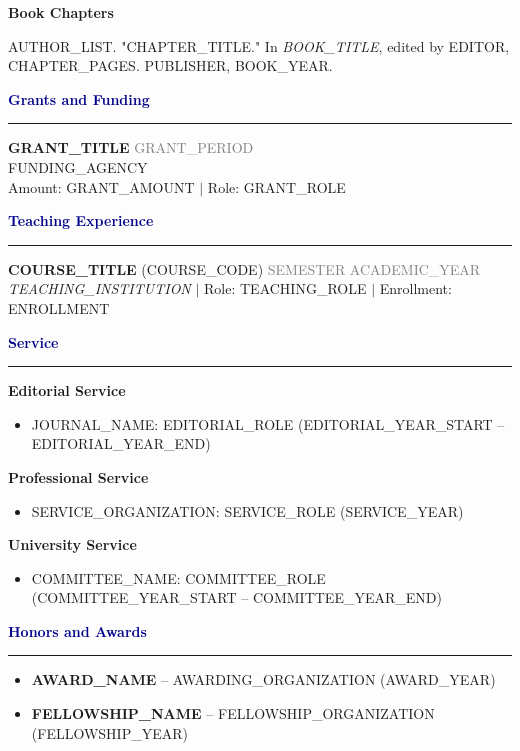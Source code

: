 \documentclass[11pt,letterpaper]{article}
\newcommand{\cvsection}[1]{\textcolor{darkblue}{\textbf{\large #1}}\hrule\vspace{0.1in}}
\begin{document}
\textbf{Book Chapters}
\begin{etaremune}
    \item {AUTHOR\_LIST}. "{CHAPTER\_TITLE}." In \textit{{BOOK\_TITLE}}, edited by {EDITOR}, {CHAPTER\_PAGES}. {PUBLISHER}, {BOOK\_YEAR}.
\end{etaremune}
\vspace{0.15in}

\cvsection{Grants and Funding}

\textbf{{GRANT\_TITLE}} \hfill \textcolor{gray}{{GRANT\_PERIOD}} \\
{FUNDING\_AGENCY} \\
Amount: {GRANT\_AMOUNT} $|$ Role: {GRANT\_ROLE}
\vspace{0.15in}

\cvsection{Teaching Experience}

\textbf{{COURSE\_TITLE}} ({COURSE\_CODE}) \hfill \textcolor{gray}{{SEMESTER} {ACADEMIC\_YEAR}} \\
\textit{{TEACHING\_INSTITUTION}} $|$ Role: {TEACHING\_ROLE} $|$ Enrollment: {ENROLLMENT}
\vspace{0.15in}

\cvsection{Service}

\textbf{Editorial Service}
\begin{itemize}[leftmargin=0.2in]
    \item {JOURNAL\_NAME}: {EDITORIAL\_ROLE} ({EDITORIAL\_YEAR\_START} -- {EDITORIAL\_YEAR\_END})
\end{itemize}

\textbf{Professional Service}
\begin{itemize}[leftmargin=0.2in]
    \item {SERVICE\_ORGANIZATION}: {SERVICE\_ROLE} ({SERVICE\_YEAR})
\end{itemize}

\textbf{University Service}
\begin{itemize}[leftmargin=0.2in]
    \item {COMMITTEE\_NAME}: {COMMITTEE\_ROLE} ({COMMITTEE\_YEAR\_START} -- {COMMITTEE\_YEAR\_END})
\end{itemize}
\vspace{0.15in}

\cvsection{Honors and Awards}

\begin{itemize}[leftmargin=0.2in]
    \item \textbf{{AWARD\_NAME}} -- {AWARDING\_ORGANIZATION} ({AWARD\_YEAR})
    \item \textbf{{FELLOWSHIP\_NAME}} -- {FELLOWSHIP\_ORGANIZATION} ({FELLOWSHIP\_YEAR})
\end{itemize}
\vspace{0.15in}
\end{document}
